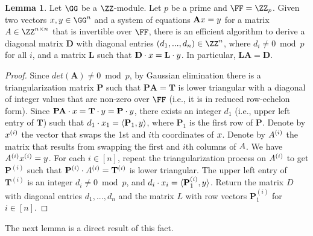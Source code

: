 \documentclass{article}
\theoremstyle{definition}
\newtheorem{lemma}{Lemma}
\begin{document}
\begin{lemma}\label{lem:triangularization}
Let $\G$ be a $\Z$-module. Let $p$ be a prime and $\F = \Z_p$. Given two vectors $\x, \y \in \G^n$ and a system of equations $\mathbf{A} x = y$ for a matrix $\A \in \Z^{n \times n}$ that is invertible over $\F$, 
there is an efficient algorithm to derive a diagonal matrix $\mathbf{D}$ with diagonal entries  $(d_1,...,d_n) \in \Z^n$, where $d_i \neq 0 \bmod p$ for all $i$, and a matrix $\mathbf{L}$ such that $\mathbf{D} \cdot x = \mathbf{L} \cdot y$. In particular, $\mathbf{L} \mathbf{A} = \mathbf{D}$.    
\end{lemma} 
\begin{proof} 
Since $det(\mathbf{A}) \neq 0 \bmod p$, by Gaussian elimination there is a triangularization matrix $\mathbf{P}$ such that $\mathbf{P} \mathbf{A} = \mathbf{T}$ is lower triangular with a diagonal of integer values that are non-zero over $\F$ (i.e., it is in reduced row-echelon form). 
Since $\mathbf{P} \mathbf{A} \cdot x = \mathbf{T} \cdot y= \mathbf{P}\cdot y$, there exists an integer $d_1$ (i.e., upper left entry of $\mathbf{T}$) such that $d_1 \cdot x_1 =\langle \mathbf{P}_1, y \rangle$, where $\mathbf{P}_1$ is the first row of $\mathbf{P}$. Denote by $x^{(i)}$ the vector that swaps the 1st and $i$th coordinates of $x$. Denote by $A^{(i)}$ the matrix that results from swapping the first and $i$th columns of $A$. We have $A^{(i)} x^{(i)} = y$. 
 For each $i \in [n]$, repeat the triangularization process on $A^{(i)}$ to get $\mathbf{P}^{(i)}$ such that $\mathbf{P}^{(i)} \cdot A^{(i)} = \mathbf{T}^{(i)}$ is lower triangular. The upper left entry of $\mathbf{T}^{(i)}$ is an integer $d_i \neq 0 \bmod p$, and $d_i \cdot x_i = \langle \mathbf{P}^{(i)}_1, y \rangle$.
  Return the matrix $D$ with diagonal entries $d_1,...,d_n$ and the matrix $L$ with row vectors $\mathbf{P}^{(i)}_1$ for $i \in [n]$. 
\end{proof} 

The next lemma is a direct result of this fact. 
\end{document}
